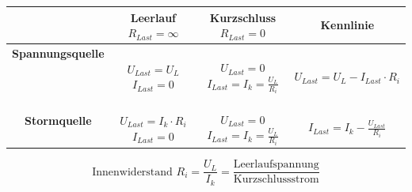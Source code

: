 \documentclass{article}
\begin{document}
\begin{mdframed}
\begin{tabular}{c|c|c|c}
      & \makecell{\textbf{Leerlauf}\\$R_{Last} = \infty$} & \makecell{\textbf{Kurzschluss}\\$R_{Last} = 0$} & Kennlinie \\\hline
     \makecell{\textbf{Spannungsquelle}\\\\\raisebox{-0.5\height}{}\\\\} & \makecell{$U_{Last} = U_L$\\$I_{Last} = 0$} & \makecell{$U_{Last} = 0$\\$I_{Last} = I_k = \frac{U_L}{R_i}$} &\makecell{\raisebox{-0.5\height}{}\\$U_{Last} = U_L - I_{Last} \cdot R_i$} \\\cline{2-4}
     \makecell{\textbf{Stormquelle}\\\\\raisebox{-0.5\height}{}} & \makecell{$U_{Last} = I_k \cdot R_i$\\$I_{Last} = 0$} & \makecell{$U_{Last} = 0$\\$I_{Last} = I_k = \frac{U_L}{R_i}$} &\makecell{\raisebox{-0.5\height}{}\\$I_{Last} = I_k - \frac{U_{Last}}{R_i}$}\\\hline
\end{tabular}
\[\text{Innenwiderstand } R_i = \frac{U_L}{I_k} = \frac{\text{Leerlaufspannung}}{\text{Kurzschlussstrom}}\]\\
\end{mdframed}

\flushleft
\end{document}
